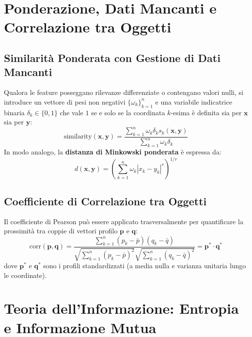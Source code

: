 \section{Ponderazione, Dati Mancanti e Correlazione tra Oggetti}
\label{sec:dm-weighting-correlation}

\FloatBarrier
\subsection{Similarità Ponderata con Gestione di Dati Mancanti}
Qualora le feature posseggano rilevanze differenziate o contengano valori nulli, si introduce un vettore di pesi non negativi $\{\omega_k\}_{k=1}^n$ e una variabile indicatrice binaria $\delta_k \in \{0, 1\}$ che vale $1$ se e solo se la coordinata $k$-esima è definita sia per $\mathbf{x}$ sia per $\mathbf{y}$:
\begin{equation}
    \text{similarity}(\mathbf{x}, \mathbf{y}) = \frac{\sum_{k=1}^n \omega_k \delta_k s_k(\mathbf{x}, \mathbf{y})}{\sum_{k=1}^n \omega_k \delta_k}
\end{equation}
In modo analogo, la \textbf{distanza di Minkowski ponderata} è espressa da:
\begin{equation}
    d(\mathbf{x}, \mathbf{y}) = \left( \sum_{k=1}^n \omega_k |x_k - y_k|^r \right)^{1/r}
\end{equation}

\FloatBarrier
\subsection{Coefficiente di Correlazione tra Oggetti}
Il coefficiente di Pearson può essere applicato trasversalmente per quantificare la prossimità tra coppie di vettori profilo $\mathbf{p}$ e $\mathbf{q}$:
\begin{equation}
    \text{corr}(\mathbf{p}, \mathbf{q}) = \frac{\sum_{k=1}^n (p_k - \bar{p})(q_k - \bar{q})}{\sqrt{\sum_{k=1}^n (p_k - \bar{p})^2} \sqrt{\sum_{k=1}^n (q_k - \bar{q})^2}} = \mathbf{p}^* \cdot \mathbf{q}^*
\end{equation}
dove $\mathbf{p}^*$ e $\mathbf{q}^*$ sono i profili standardizzati (a media nulla e varianza unitaria lungo le coordinate).

\FloatBarrier
\section{Teoria dell'Informazione: Entropia e Informazione Mutua}
\label{sec:dm-information-theory}

